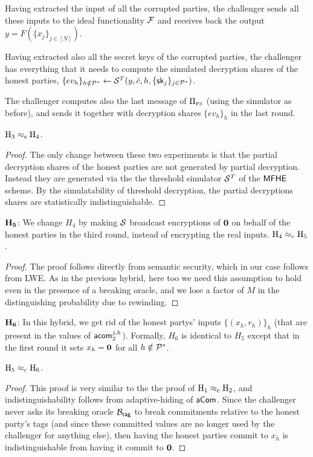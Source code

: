\item Having extracted the input of all the corrupted parties, the challenger sends all these inputs to the ideal functionality $\mathbf{\mathcal{F}}$ and receives back the output $y = F(\{x_j\}_{j \in [N]})$.

\item Having extracted also all the secret keys of the corrupted parties, the challenger has everything that it needs to compute the simulated decryption shares of the honest parties, $\{ev_h\}_{h\notin{\cal P}^*}\leftarrow {\cal S}^T(y, {{\hat{c}}},h,\{{\mathsf{sk}}_j\}{_{j\in{\cal P}^*}})$.

\item The challenger computes also the last message of $\Pi_{{\scriptscriptstyle\mathrm{FS}}}$ (using the simulator as before), and sends it together with decryption shares $\{ev_h\}_h$ in the last round.
\EE

\BL$\mathrm{\mathrm{H}_{3}} \approx_{\mathrm{s}}  \mathrm{\mathrm{H}_{4}}$.\EL
\begin{proof}
  The only change between these two experiments is that the partial decryption shares of the honest parties are not generated by partial decryption. Instead they are generated via the the threshold simulator ${\cal S}^T$ of the ${\mathsf{MFHE}}$ scheme. By the simulatability of threshold decryption, the partial decryptions shares are statistically indistinguishable.
\end{proof}


\smallskip
\item{$\bf H_5$:} 
We change $H_4$ by making ${\cal S}$ broadcast encryptions of ${\bf 0}$ on behalf of the honest parties in the third round, instead of encrypting the real inputs. 
\smallskip
\BL$\mathrm{\mathrm{H}_{4}} \approx_{\mathrm{c}}  \mathrm{\mathrm{H}_{5}}$.
\label{lem:Hyb5-6}
\EL
\begin{proof}
The proof follows directly from semantic security, which in our case follows from LWE. As in the previous hybrid, here too we need this assumption to hold even in the presence of a breaking oracle, and we lose a factor of $M$ in the distinguishing probability due to rewinding.
\end{proof}

\smallskip
\item{$\bf H_6$:} In this hybrid, we get rid of the honest partys' inputs $\{(x_h,r_h)\}_h$ (that are present in the values of $\mathsf{acom}_2^{j,h}$). Formally, $H_6$ is identical to $H_5$ except that in the first round it sets $x_h={\bf 0}$ for all $h\notin{\cal P}^*$.

\BL$\mathrm{\mathrm{H}_{5}} \approx_{\mathrm{c}}  \mathrm{\mathrm{H}_{6}}$.\EL

\begin{proof}
  This proof is very similar to the the proof of $\mathrm{\mathrm{H}_{1}} \approx_{\mathrm{c}}  \mathrm{\mathrm{H}_{2}}$, and indistinguishability follows from adaptive-hiding of $\mathsf{aCom}$. Since the challenger never asks its breaking oracle $\mathcal{B}_{\mathsf{tag}}$ to break commitments relative to the honest party's tags (and since these committed values are no longer used by the challenger for anything else), then having the honest parties commit to $x_h$ is indistinguishable from having it commit to ${\bf 0}$.
\end{proof}

